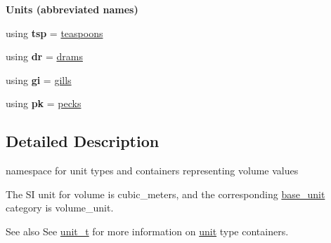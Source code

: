 \begin{Indent}{\bf Units (abbreviated names)}
\begin{DoxyCompactItemize}
\item 
\hypertarget{namespaceunits_1_1volume_a488a04e8a13f1de1ce285bdf1f0d4f44}{}using {\bfseries tsp} = \hyperlink{structunits_1_1unit}{teaspoons}\label{namespaceunits_1_1volume_a488a04e8a13f1de1ce285bdf1f0d4f44}

\item 
\hypertarget{namespaceunits_1_1volume_aa7f20e0e06179872bbbcef79e53fd60c}{}using {\bfseries dr} = \hyperlink{structunits_1_1unit}{drams}\label{namespaceunits_1_1volume_aa7f20e0e06179872bbbcef79e53fd60c}

\item 
\hypertarget{namespaceunits_1_1volume_af98cd9f9f86d0a94e0b1a4716ba566a4}{}using {\bfseries gi} = \hyperlink{structunits_1_1unit}{gills}\label{namespaceunits_1_1volume_af98cd9f9f86d0a94e0b1a4716ba566a4}

\item 
\hypertarget{namespaceunits_1_1volume_a3c9a8638c4ceb3518dcd5bfff0dc8460}{}using {\bfseries pk} = \hyperlink{structunits_1_1unit}{pecks}\label{namespaceunits_1_1volume_a3c9a8638c4ceb3518dcd5bfff0dc8460}

\end{DoxyCompactItemize}
\end{Indent}


\subsection{Detailed Description}
namespace for unit types and containers representing volume values 

The S\+I unit for volume is {\ttfamily cubic\+\_\+meters}, and the corresponding {\ttfamily \hyperlink{structunits_1_1base__unit}{base\+\_\+unit}} category is {\ttfamily volume\+\_\+unit}. \begin{DoxySeeAlso}{See also}
See \hyperlink{classunits_1_1unit__t}{unit\+\_\+t} for more information on \hyperlink{structunits_1_1unit}{unit} type containers. 
\end{DoxySeeAlso}
